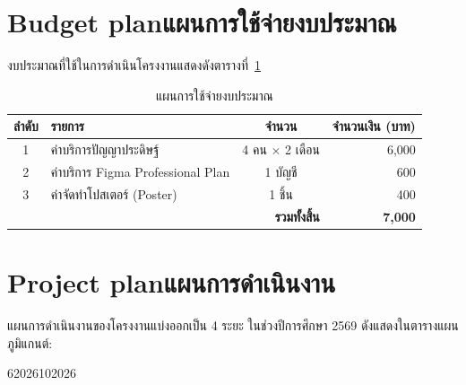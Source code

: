 \section{\ifenglish Budget plan\else แผนการใช้จ่ายงบประมาณ\fi}
งบประมาณที่ใช้ในการดำเนินโครงงานแสดงดังตารางที่~\ref{tab:budget}

\begin{table}[htbp]
\centering
\begin{tabular}{|c|p{7cm}|c|r|}
\hline
\textbf{ลำดับ} & \textbf{รายการ} & \textbf{จำนวน} & \textbf{จำนวนเงิน (บาท)} \\ \hline
1 & ค่าบริการปัญญาประดิษฐ์ & 4 คน $\times$ 2 เดือน & 6,000 \\ \hline
2 & ค่าบริการ Figma Professional Plan & 1 บัญชี & 600 \\ \hline
3 & ค่าจัดทำโปสเตอร์ (Poster) & 1 ชิ้น & 400 \\ \hline
\multicolumn{3}{|r|}{\textbf{รวมทั้งสิ้น}} & \textbf{7,000} \\ \hline
\end{tabular}
\caption{แผนการใช้จ่ายงบประมาณ}
\label{tab:budget}
\end{table}
\section{\ifenglish Project plan\else แผนการดำเนินงาน\fi}
แผนการดำเนินงานของโครงงานแบ่งออกเป็น 4 ระยะ ในช่วงปีการศึกษา 2569 ดังแสดงในตารางแผนภูมิแกนต์:

\begin{plan}{6}{2026}{10}{2026}
\end{plan}

